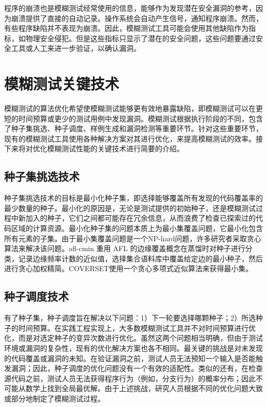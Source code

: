 \documentclass[master]{thesis-uestc}
\begin{document}
程序的崩溃也是模糊测试经常使用的信息，能够作为发现潜在安全漏洞的参考，因为崩溃提供了直接的自动记录。操作系统会自动产生信号，通知程序崩溃。然而，有些程序缺陷并不表现为崩溃。因此，模糊测试工具可能会使用其他缺陷作为指标，如物理安全侵犯。但是这些指标只显示了潜在的安全问题，这些问题要通过安全工具或人工来进一步验证，以确认漏洞。

\section{模糊测试关键技术}

模糊测试的算法优化希望使模糊测试能够更有效地暴露缺陷，即模糊测试可以在更短的时间预算或更少的测试用例中发现漏洞。模糊测试根据执行阶段的不同，包含了种子集挑选、种子调度、样例生成和漏洞检测等重要环节。针对这些重要环节，现有的模糊测试工具使用各种解决方案对其进行优化，来提高模糊测试的效率。接下来将对优化模糊测试性能的关键技术进行简要的介绍。

\subsection{种子集挑选技术}


种子集挑选技术的目标是最小化种子集，即选择能够覆盖所有发现的代码覆盖率的最少数量的种子。最小化的原因是，无论是测试提供的初始种子，还是模糊测试过程中新加入的种子，它们之间都可能存在冗余信息，从而浪费了检查已探索过的代码区域的计算资源。最小化种子集的问题本质上为最小集覆盖问题，它最小化包含所有元素的子集。由于最小集覆盖问题是一个NP-hard问题，许多研究者采取贪心算法来解决该问题。afl-cmin 重用 AFL 的边缘覆盖概念在蒸馏时对种子进行分类，记录边缘频率计数的近似值，选择集合语料库中覆盖给定边的最小种子，然后进行贪心加权精简。COVERSET使用一个贪心多项式近似算法来获得最小集。

\subsection{种子调度技术}

有了种子集，种子调度旨在解决以下问题：1）下一轮要选择哪颗种子；2）所选种子的时间预算。在实践工程实现上，大多数模糊测试工具并不对时间预算进行优化，而是对选定种子的变异次数进行优化。虽然这两个问题相当明确，但由于测试环境或漏洞的复杂性，现有的优化解决方案也各不相同。最关键的挑战是对未发现的代码覆盖或漏洞的未知。在验证漏洞之前，测试人员无法预知一个输入是否能触发漏洞；因此，种子调度的优化问题没有一个有效的适配性。类似的还有，在检查源代码之前，测试人员无法获得程序行为（例如，分支行为）的概率分布；因此不可能从数学上找到全局最优解。由于上述挑战，研究人员根据不同的优化问题大致或部分地制定了模糊测试过程。
\end{document}
